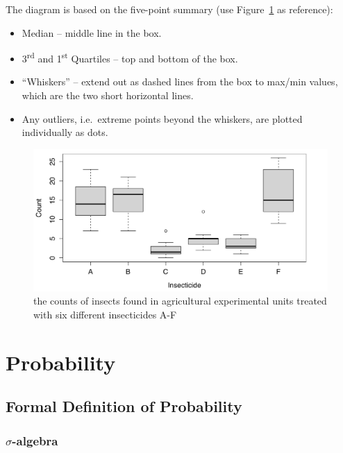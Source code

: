 \documentclass[12pt]{report}
\theoremstyle{definition}
\begin{document}
The diagram is based on the five-point summary (use Figure~\ref{box-plot} as
reference):
\begin{itemize}
    \item Median -- middle line in the box.
    \item 3\textsuperscript{rd} and 1\textsuperscript{st} Quartiles -- top and
        bottom of the box.
    \item ``Whiskers'' -- extend out as dashed lines from the box to max/min
        values, which are the two short horizontal lines.
    \item Any outliers, i.e.\ extreme points beyond the whiskers, are plotted
        individually as dots.
\end{itemize} 
\begin{figure}[h]
  	\includegraphics[scale=0.18]{./images/box-and-whisker.jpeg}
  	\centering
  	\caption{the counts of insects found in agricultural experimental units
    treated with six different insecticides A-F}\label{box-plot}
\end{figure}

\chapter{Probability}

\section{Formal Definition of Probability}

\subsection{$\sigma$-algebra}
\end{document}

